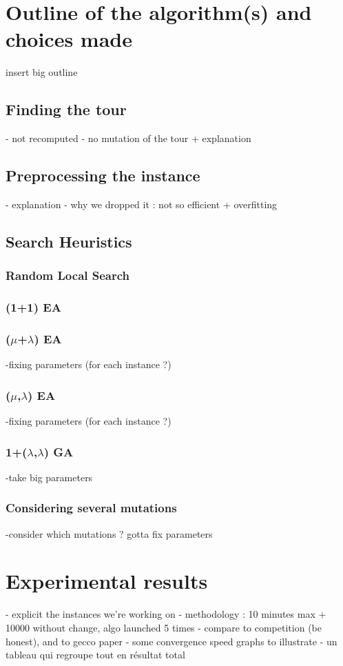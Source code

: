 \documentclass[a4paper]{article}
\begin{document}
\begin{center}
\end{center}


\section{Outline of the algorithm(s) and choices made}
insert big outline
\subsection{Finding the tour}
- not recomputed
- no mutation of the tour + explanation
\subsection{Preprocessing the instance}
- explanation
- why we dropped it : not so efficient + overfitting
\subsection{Search Heuristics}
\subsubsection{Random Local Search}
\subsubsection{(1+1) EA}
\subsubsection{($\mu$+$\lambda$) EA}
-fixing parameters (for each instance ?)
\subsubsection{($\mu$,$\lambda$) EA}
-fixing parameters (for each instance ?)
\subsubsection{1+($\lambda$,$\lambda$) GA}
-take big parameters
\subsubsection{Considering several mutations}
-consider which mutations ? gotta fix parameters
\section{Experimental results}
- explicit the instances we're working on
- methodology : 10 minutes max + 10000 without change, algo launched 5 times
- compare to competition (be honest), and to gecco paper
- some convergence speed graphs to illustrate
- un tableau qui regroupe tout en résultat total
\end{document}
